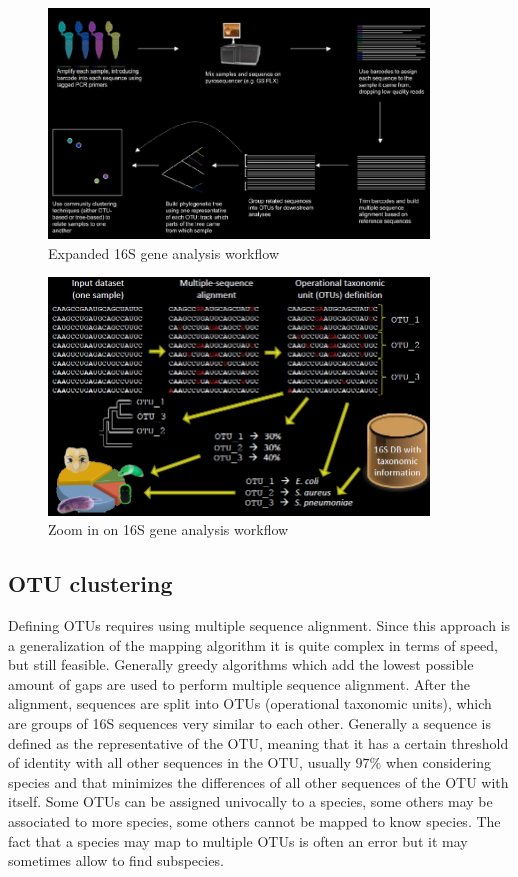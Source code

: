     \begin{figure}[!h]
      \centering
      \includegraphics[width=0.9\textwidth]{expanded_workflow.png}
      \caption{\label{fig:expanded_workflow}Expanded 16S gene analysis workflow}
    \end{figure}

    \begin{figure}[!h]
      \centering
      \includegraphics[width=0.9\textwidth]{zoom_in_16S.png}
      \caption{\label{fig:zoom_in_16S}Zoom in on 16S gene analysis workflow}
    \end{figure}

  \subsection{OTU clustering}
  Defining OTUs requires using multiple sequence alignment.
  Since this approach is a generalization of the mapping algorithm it is quite complex in terms of speed, but still feasible.
  Generally greedy algorithms which add the lowest possible amount of gaps are used to perform multiple sequence alignment.
  After the alignment, sequences are split into OTUs (operational taxonomic units), which are groups of 16S sequences very similar to each other.
  Generally a sequence is defined as the representative of the OTU, meaning that it has a certain threshold of identity with all other sequences in the OTU, usually $97\%$ when considering species and that minimizes the differences of all other sequences of the OTU with itself.
  Some OTUs can be assigned univocally to a species, some others may be associated to more species, some others cannot be mapped to know species.
  The fact that a species may map to multiple OTUs is often an error but it may sometimes allow to find subspecies.

